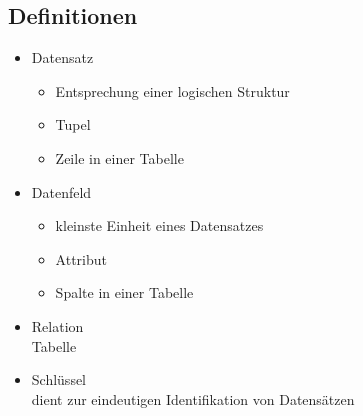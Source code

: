 \documentclass[12pt,a4paper]{report}
\begin{document}
\begin{onehalfspace}
\section{Definitionen}
\begin{itemize}
\item Datensatz
\begin{itemize}
\item Entsprechung einer logischen Struktur
\item Tupel
\item Zeile in einer Tabelle
\end{itemize}
\item Datenfeld
\begin{itemize}
\item kleinste Einheit eines Datensatzes
\item Attribut
\item Spalte in einer Tabelle
\end{itemize}
\item Relation\\
Tabelle
\item Schlüssel\\
dient zur eindeutigen Identifikation von Datensätzen
\end{itemize}

\end{onehalfspace}
\end{document}

